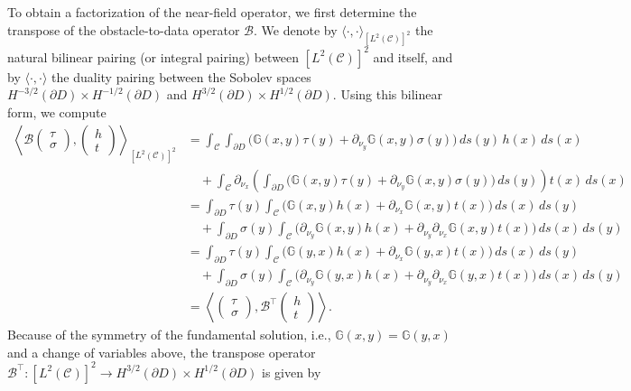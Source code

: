 \documentclass{article}
\begin{document}
To obtain a factorization of the near-field operator, we first determine the transpose of the obstacle-to-data operator $\mathcal B$. 
We denote by $\langle \cdot, \cdot \rangle_{[L^2(\mathcal C)]^2}$ the natural bilinear pairing (or integral pairing) between $[L^2(\mathcal C)]^2$ and itself, and by $\langle \cdot, \cdot \rangle$ the duality pairing between the Sobolev spaces $H^{-3/2}(\partial D)\times H^{-1/2}(\partial D)$ and $H^{3/2}(\partial D)\times H^{1/2}(\partial D)$. Using this bilinear form, we compute
\begin{align*}
\left\langle
\mathcal B
\begin{pmatrix}
\tau\\
\sigma
\end{pmatrix},
\begin{pmatrix}
h\\
t
\end{pmatrix}
\right\rangle_{[L^2(\mathcal C)]^2}
&=
\int_{\mathcal C}
\int_{\partial D}
\Big(
\mathbb G(x,y)\tau(y)
+
\partial_{\nu_y}\mathbb G(x,y)\sigma(y)
\Big)\,ds(y)\,h(x)\,ds(x)
\\
&\quad+
\int_{\mathcal C}
\partial_{\nu_x}
\left(
\int_{\partial D}
\Big(
\mathbb G(x,y)\tau(y)
+
\partial_{\nu_y}\mathbb G(x,y)\sigma(y)
\Big)\,ds(y)
\right)
t(x)\,ds(x)
\\[1ex]
&=
\int_{\partial D}\tau(y)
\int_{\mathcal C}
\Big(
\mathbb G(x,y)h(x)
+
\partial_{\nu_x}\mathbb G(x,y)t(x)
\Big)\,ds(x)\,ds(y)
\\
&\quad+
\int_{\partial D}\sigma(y)
\int_{\mathcal C}
\Big(
\partial_{\nu_y}\mathbb G(x,y)h(x)
+
\partial_{\nu_y}\partial_{\nu_x}\mathbb G(x,y)t(x)
\Big)\,ds(x)\,ds(y)
\\[1ex]
&=
\int_{\partial D}
\tau(y)
\int_{\mathcal C}
\Big(
\mathbb G(y,x)h(x)
+
\partial_{\nu_x}\mathbb G(y,x)t(x)
\Big)\,ds(x)\,ds(y)
\\
&\quad+
\int_{\partial D}
\sigma(y)
\int_{\mathcal C}
\Big(
\partial_{\nu_y}\mathbb G(y,x)h(x)
+
\partial_{\nu_y}\partial_{\nu_x}\mathbb G(y,x)t(x)
\Big)\,ds(x)\,ds(y)
\\[1ex]
&=
\left\langle
\begin{pmatrix}
\tau\\
\sigma
\end{pmatrix},
\mathcal B^\top
\begin{pmatrix}
h\\
t
\end{pmatrix}
\right\rangle.
\end{align*}
Because of the symmetry of the fundamental solution, i.e.,  $\mathbb G(x,y)=\mathbb G(y,x)$ and a change of variables above, the transpose operator $\mathcal B^\top : [L^2(\mathcal{C})]^2 \to H^{3/2}(\partial D)\times H^{1/2}(\partial D)$ is given by
\end{document}
